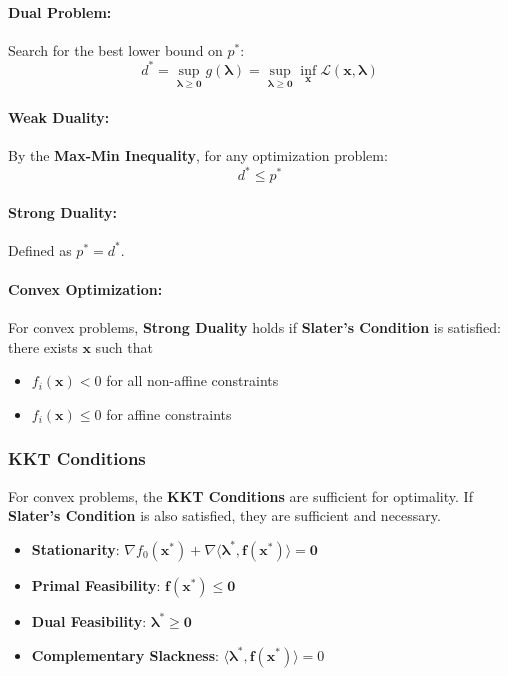 \documentclass{article}
\begin{document}
\paragraph{Dual Problem:} Search for the best lower bound on $p^*$:
\[
    d^* = \sup_{\boldsymbol{\lambda} \ge \mathbf{0}} g(\boldsymbol{\lambda}) = \sup_{\boldsymbol{\lambda} \ge \mathbf{0}} \inf_{\mathbf{x}} \mathcal{L}(\mathbf{x}, \boldsymbol{\lambda})
\]

\paragraph{Weak Duality:} By the \textbf{Max-Min Inequality}, for any optimization problem:
\[
    d^* \le p^*
\]

\paragraph{Strong Duality:} Defined as $p^* = d^*$.

\paragraph{Convex Optimization:} For convex problems, \textbf{Strong Duality} holds if \textbf{Slater's Condition} is satisfied: there exists $\mathbf{x}$ such that
\begin{itemize}
    \item $f_i(\mathbf{x}) < 0$ for all non-affine constraints
    \item $f_i(\mathbf{x}) \le 0$ for affine constraints
\end{itemize}

\subsubsection{KKT Conditions}
For convex problems, the \textbf{KKT Conditions} are sufficient for optimality. If \textbf{Slater's Condition} is also satisfied, they are sufficient and necessary.
\begin{itemize}
    \item \textbf{Stationarity}: $\nabla f_0(\mathbf{x}^*) + \nabla \langle \boldsymbol{\lambda}^*, \mathbf{f}(\mathbf{x}^*) \rangle = \mathbf{0}$
    \item \textbf{Primal Feasibility}: $\mathbf{f}(\mathbf{x}^*) \le \mathbf{0}$
    \item \textbf{Dual Feasibility}: $\boldsymbol{\lambda}^* \ge \mathbf{0}$
    \item \textbf{Complementary Slackness}: $\langle \boldsymbol{\lambda}^*, \mathbf{f}(\mathbf{x}^*) \rangle = 0$
\end{itemize}
\end{document}
